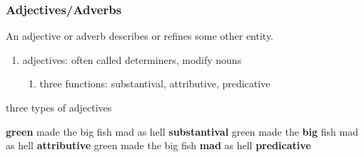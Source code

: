 \documentclass[12pt]{article}
\begin{document}
\subsubsection{Adjectives/Adverbs}
An adjective or adverb describes or refines some other entity.
\begin{enumerate}
\item adjectives: often called determiners, modify nouns
    \begin{enumerate}
    \item three functions: substantival, attributive, predicative
    \end{enumerate}
\end{enumerate}
\begin{exe}
\ex three types of adjectives
    \begin{xlist}
    \ex \textbf{green} made the big fish mad as hell \hfill \textbf{substantival}
    \ex green made the \textbf{big} fish mad as hell \hfill 
    \textbf{attributive}
    \ex green made the big fish \textbf{mad} as hell \hfill \textbf{predicative}
    \end{xlist}
\end{exe}
\end{document}
